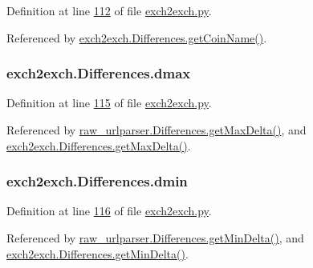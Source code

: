 Definition at line \hyperlink{exch2exch_8py_source_l00112}{112} of file \hyperlink{exch2exch_8py_source}{exch2exch.\+py}.



Referenced by \hyperlink{exch2exch_8py_source_l00151}{exch2exch.\+Differences.\+get\+Coin\+Name()}.

\subsubsection[{\texorpdfstring{dmax}{dmax}}]{\setlength{\rightskip}{0pt plus 5cm}exch2exch.\+Differences.\+dmax}\hypertarget{classexch2exch_1_1_differences_a261a74cc25d77b2608898fa5611f9f0b}{}\label{classexch2exch_1_1_differences_a261a74cc25d77b2608898fa5611f9f0b}


Definition at line \hyperlink{exch2exch_8py_source_l00115}{115} of file \hyperlink{exch2exch_8py_source}{exch2exch.\+py}.



Referenced by \hyperlink{raw__urlparser_8py_source_l00097}{raw\+\_\+urlparser.\+Differences.\+get\+Max\+Delta()}, and \hyperlink{exch2exch_8py_source_l00130}{exch2exch.\+Differences.\+get\+Max\+Delta()}.

\subsubsection[{\texorpdfstring{dmin}{dmin}}]{\setlength{\rightskip}{0pt plus 5cm}exch2exch.\+Differences.\+dmin}\hypertarget{classexch2exch_1_1_differences_a7825bfca16b5775aa770c8810412b215}{}\label{classexch2exch_1_1_differences_a7825bfca16b5775aa770c8810412b215}


Definition at line \hyperlink{exch2exch_8py_source_l00116}{116} of file \hyperlink{exch2exch_8py_source}{exch2exch.\+py}.



Referenced by \hyperlink{raw__urlparser_8py_source_l00094}{raw\+\_\+urlparser.\+Differences.\+get\+Min\+Delta()}, and \hyperlink{exch2exch_8py_source_l00127}{exch2exch.\+Differences.\+get\+Min\+Delta()}.

